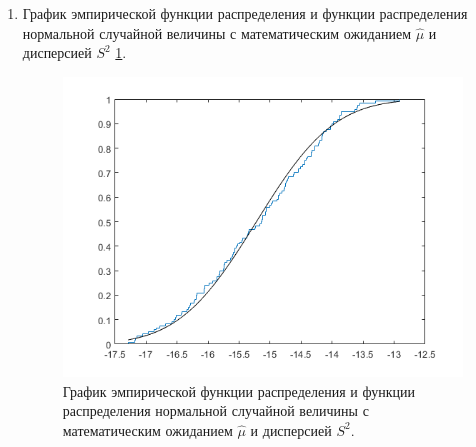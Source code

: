 \documentclass[a4paper,oneside,12pt]{extreport}
\theoremstyle{indented}
\begin{document}
\begin{enumerate}
\item График эмпирической функции распределения и функции распределения нормальной случайной величины с математическим ожиданием $\hat \mu$ и дисперсией $S^2$ \ref{img:outputGraph2}. 

\begin{figure}[H]
\begin{center}
\includegraphics[scale=1]{inc/img/outputGraph2.png}
\captionsetup{justification=centering}
	\caption{График эмпирической функции распределения и функции распределения нормальной случайной величины с математическим ожиданием $\hat \mu$ и дисперсией $S^2$.}
	\label{img:outputGraph2}	
\end{center}
\end{figure}

\end{enumerate}
\end{document}
